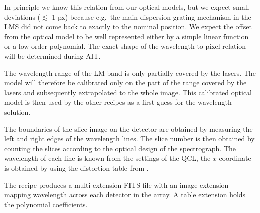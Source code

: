 In principle we know this relation from our optical models, but we expect small
deviations ($\lesssim$ 1 px) because e.g.\ the main dispersion grating mechanism
in the \ac{LMS} did not come back to exactly to the nominal position.
We expect the offset from the optical model to be well represented either by a
simple linear function or a low-order polynomial.
The exact shape of the wavelength-to-pixel relation will be determined during
\ac{AIT}.

The wavelength range of the LM band is only partially covered by the lasers.
The model will therefore be calibrated only on the part of the range covered by
the lasers and subsequently extrapolated to the whole image.
This calibrated optical model is then used by the other recipes as a first
guess for the wavelength solution.

The boundaries of the slice image on the detector are obtained by
measuring the left and right edges of the wavelength lines.
The slice number is then obtained by counting the
slices according to the optical design of the spectrograph.
The wavelength of each line is known from the settings of the \ac{QCL}, the $x$
coordinate is obtained by
using the distortion table from .

The recipe produces a multi-extension FITS file with an image
extension mapping wavelength across each detector in the array.
A table extension holds the polynomial coefficients.

